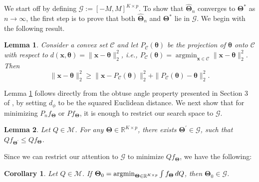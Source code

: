 \documentclass{article}
\def\argmin{\mathop{\rm argmin}\nolimits}
\newtheorem{lemma}{Lemma}[section]
\newtheorem{cor}{Corollary}[section]
\begin{document}
We start off by defining $\mathscr{G} := [-M,M]^{K \times p}$. To show that $\displaystyle \widehat{\bm{\Theta}}_n$ converges to $\bm{\Theta}^*$ as $n \to \infty$, the first step is to prove that both $\widehat{\bm{\Theta}}_n$ and $\displaystyle \bm{\Theta}^*$ lie in $\mathscr{G}$. We begin with the following result.


\begin{lemma}\label{lemma-1-obtuse}
    Consider a convex set $\mathcal{C}$ and let $P_{\mathcal{C}}(\bm{\theta})$ be the projection of $\bm{\theta}$ onto $\mathcal{C}$ with respect to $d(\bm{x},\bm{\theta})=\|\bm{x}-\bm{\theta}\|_2^2$, i.e., $P_\mathcal{C}(\bm{\theta})=\operatorname{argmin}_{\bm{x}\in \mathcal{C}}\|\bm{x}-\bm{\theta}\|_2^2$. Then \[\|\bm{x}-\bm{\theta}\|_2^2\ge \|\bm{x}-P_{\mathcal{C}}(\bm{\theta})\|_2^2+\|P_{\mathcal{C}}(\bm{\theta})-\bm{\theta}\|_2^2.\]
\end{lemma}

Lemma \ref{lemma-1-obtuse} follows directly from the obtuse angle property presented in Section 3 of \citep{paul2021a}, by setting $d_\phi$ to be the squared Euclidean distance. We next show that for minimizing $P_n f_{\bm{\Theta}}$ or $P f_{\bm{\Theta}}$, it is enough to restrict our search space to $\mathscr{G}$.

\begin{lemma}\label{lemma-2}
    Let $Q \in \mathcal{M}$. For any $\bm{\Theta} \in \mathbb{R}^{K \times p}$, there exists $\bm{\Theta}^{\prime} \in\mathscr{G}$, such that $Q f_{\bm{\Theta^{\prime}}} \leq Q f_{\bm{\Theta}}$.
\end{lemma}

Since we can restrict our attention to $\mathscr{G}$ to minimize $Q f_{\bm\Theta}$, we have the following:

\begin{cor}
    Let $Q \in \mathcal{M}$. If $\bm{\Theta}_0=\argmin_{\bm{\Theta} \in \mathbb{R}^{K \times p}} \int f_{\bm{\Theta}} \,dQ$, then $\bm{\Theta}_0 \in \mathscr{G}$.
\end{cor}
\end{document}
